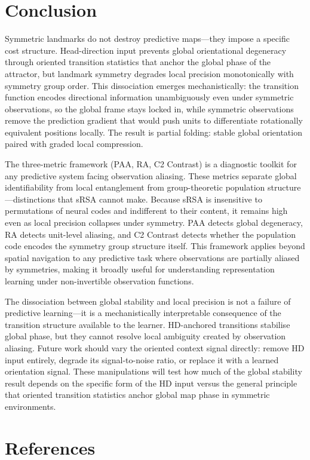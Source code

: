 \documentclass[11pt, a4paper]{article}
\begin{document}
\clearpage

\section*{Conclusion}

Symmetric landmarks do not destroy predictive maps---they impose a specific cost structure. Head-direction input prevents global orientational degeneracy through oriented transition statistics that anchor the global phase of the attractor, but landmark symmetry degrades local precision monotonically with symmetry group order. This dissociation emerges mechanistically: the transition function encodes directional information unambiguously even under symmetric observations, so the global frame stays locked in, while symmetric observations remove the prediction gradient that would push units to differentiate rotationally equivalent positions locally. The result is partial folding: stable global orientation paired with graded local compression.

The three-metric framework (PAA, RA, C2 Contrast) is a diagnostic toolkit for any predictive system facing observation aliasing. These metrics separate global identifiability from local entanglement from group-theoretic population structure---distinctions that sRSA cannot make. Because sRSA is insensitive to permutations of neural codes and indifferent to their content, it remains high even as local precision collapses under symmetry. PAA detects global degeneracy, RA detects unit-level aliasing, and C2 Contrast detects whether the population code encodes the symmetry group structure itself. This framework applies beyond spatial navigation to any predictive task where observations are partially aliased by symmetries, making it broadly useful for understanding representation learning under non-invertible observation functions.

The dissociation between global stability and local precision is not a failure of predictive learning---it is a mechanistically interpretable consequence of the transition structure available to the learner. HD-anchored transitions stabilise global phase, but they cannot resolve local ambiguity created by observation aliasing. Future work should vary the oriented context signal directly: remove HD input entirely, degrade its signal-to-noise ratio, or replace it with a learned orientation signal. These manipulations will test how much of the global stability result depends on the specific form of the HD input versus the general principle that oriented transition statistics anchor global map phase in symmetric environments.

\clearpage

\section*{References}



\end{document}
